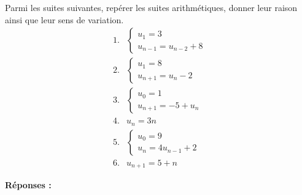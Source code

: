 \documentclass[a4paper,12pt]{article}
\begin{document}
  \begin{tcolorbox}[colback=gray!10, colframe=gray!50, title=Exercice \textbf{97}]
    Parmi les suites suivantes, repérer les suites arithmétiques, donner leur raison ainsi que leur sens de variation.
    \[
    \begin{array}{ll}
    1. & \left\{
      \begin{array}{l}
      u_1 = 3 \\
      u_{n-1} = u_{n-2} + 8
      \end{array}
      \right. \\
    2. & \left\{
      \begin{array}{l}
      u_1 = 8 \\
      u_{n+1} = u_n - 2
      \end{array}
      \right. \\
    3. & \left\{
      \begin{array}{l}
      u_0 = 1 \\
      u_{n+1} = -5 + u_n
      \end{array}
      \right. \\
    4. & u_n = 3n \\
    5. & \left\{
      \begin{array}{l}
      u_0 = 9 \\
      u_n = 4u_{n-1} + 2
      \end{array}
      \right. \\
    6. & u_{n+1} = 5 + n
    \end{array}
    \]
    \end{tcolorbox}
    
    \bigskip
    
    \textbf{Réponses :}
    
\end{document}
